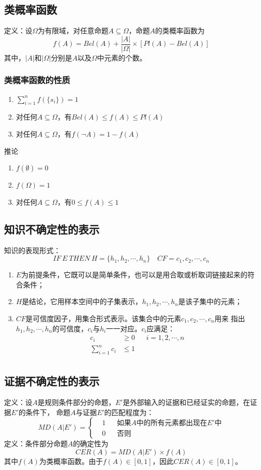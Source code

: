 \documentclass[12pt]{article}
\begin{document}
\subsection{类概率函数}
定义：设$\Omega$为有限域，对任意命题$A\subseteq\Omega$，命题$A$的类概率函数为
\[
	f(A)=Bel(A)+\frac{|A|}{|\Omega|}\times [Pl(A)-Bel(A)]
\]
其中，$|A|$和$|\Omega|$分别是$A$以及$\Omega$中元素的个数。
\subsubsection{类概率函数的性质}
\begin{enumerate}
	\item $\sum\limits_{i=1}^n f(\{s_i\})=1$
	\item 对任何$A\subseteq\Omega$，有$Bel(A)\leq f(A)\leq Pl(A)$
	\item 对任何$A\subseteq\Omega$，有$f(\neg A)=1-f(A)$
\end{enumerate}
推论
\begin{enumerate}
	\item $f(\emptyset)=0$
	\item $f(\Omega)=1$
	\item 对任何$A\subseteq\Omega$，有$0\leq f(A)\leq 1$
\end{enumerate}
\subsection{知识不确定性的表示}
知识的表现形式：
\[
	IF\ E\ THEN\ H=\{h_1,h_2,\cdots,h_n\}\quad CF={c_1,c_2,\cdots,c_n}
\]
\begin{enumerate}
	\item $E$为前提条件，它既可以是简单条件，也可以是用合取或析取词链接起来的符合条件；
	\item $H$是结论，它用样本空间中的子集表示，$h_1,h_2,\cdots,h_n$是该子集中的元素；
	\item $CF$是可信度因子，用集合形式表示。该集合中的元素$c_1,c_2,\cdots,c_n$用来
	指出$h_1,h_2,\cdots,h_n$的可信度，$c_i$与$h_i$一一对应。$c_i$应满足：
	\[
		\begin{aligned}
			c_i & \geq 0 && i=1,2,\cdots,n\\
			\sum\limits_{i=1}^n c_i & \leq 1\\
		\end{aligned}
	\]
\end{enumerate}
\subsection{证据不确定性的表示}
定义：设$A$是规则条件部分的命题，$E'$是外部输入的证据和已经证实的命题，在证据$E'$的条件下，
命题$A$与证据$E'$的匹配程度为：
\[
	MD(A|E')=\left\{
		\begin{aligned}
			&1 && 如果A中的所有元素都出现在E'中\\
			&0 && 否则
		\end{aligned}
	\right.
\]
定义：条件部分命题$A$的确定性为
\[ CER(A)=MD(A|E')\times f(A) \]
其中$f(A)$为类概率函数。由于$f(A)\in[0,1]$，因此$CER(A)\in [0,1]$。\\
\end{document}
